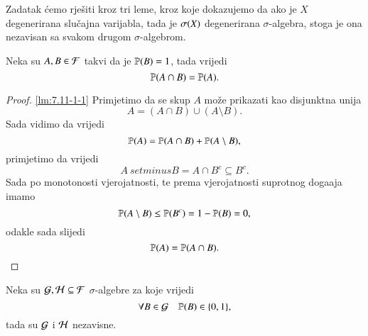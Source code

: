 \begin{rj}[\ref{zad:7.11}]
    Zadatak \' cemo rje\v siti kroz tri leme, kroz koje dokazujemo da ako je $X$ degenerirana slu\v cajna varijabla, tada je $\sigma({X})$ degenerirana $\sigma$-algebra, stoga je ona nezavisan sa svakom drugom $\sigma$-algebrom.

    \begin{lm}   \label{lm:7.11-1-1}
        Neka su $A, B \in \mathcal{F}$ takvi da je $\mathbb{P} (B) = 1$, tada vrijedi
        \begin{equation*}
            \mathbb{P} (A \cap B) = \mathbb{P} (A).
        \end{equation*}
    \end{lm}

    \begin{proof}{\ref{lm:7.11-1-1}}
        Primjetimo da se skup $A$ mo\v ze prikazati kao disjunktna unija
        \begin{equation*}
            A = (A \cap B) \cup (A \setminus B).
        \end{equation*}
        Sada vidimo da vrijedi
        \begin{equation*}
            \mathbb{P} (A) = \mathbb{P} (A \cap B) + \mathbb{P} (A \setminus B),
        \end{equation*}
        primjetimo da vrijedi
        \begin{equation*}
            A \ setminus B = A \cap B^c \subseteq B^c.
        \end{equation*}
        Sada po monotonosti vjerojatnosti, te prema vjerojatnosti suprotnog doga\dj aja imamo
        \begin{equation*}
            \mathbb{P} (A \setminus B) \leq \mathbb{P} (B^c) = 1 - \mathbb{P} (B) = 0,
        \end{equation*}
        odakle sada slijedi
        \begin{equation*}
            \mathbb{P} (A) = \mathbb{P} (A \cap B).
        \end{equation*}
    \end{proof}

    \begin{lm}  \label{lm:7.11-1-2}
        Neka su $\mathcal{G}, \mathcal{H} \subseteq \mathcal{F}$ $\sigma$-algebre za koje vrijedi
        \begin{equation*}
            \forall B \in \mathcal{G} \quad \mathbb{P} (B) \in \{0, 1 \},
        \end{equation*}
        tada su $\mathcal{G}$ i $\mathcal{H}$ nezavisne.
    \end{lm}


\end{rj}
